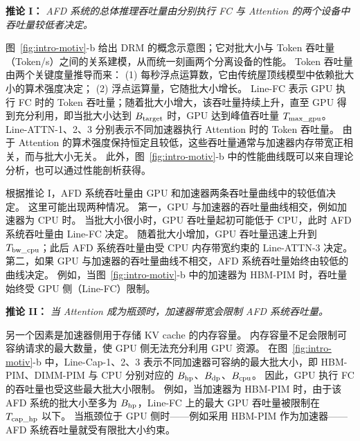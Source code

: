 \begin{mdframed}[backgroundcolor=gray!10,linecolor=black,linewidth=1pt]
\textbf{推论 I：}
\textit{AFD 系统的总体推理吞吐量由分别执行 FC 与 Attention 的两个设备中吞吐量较低者决定。}
\end{mdframed}

图~\ref{fig:intro-motiv}-b 给出 DRM 的概念示意图；它对批大小与 Token 吞吐量（Token/s）之间的关系建模，从而统一刻画两个分离设备的性能。
Token 吞吐量由两个关键度量推导而来：
(1) 每秒浮点运算数，它由传统屋顶线模型中依赖批大小的算术强度决定；
(2) 浮点运算量，它随批大小增长。
Line-FC 表示 GPU 执行 FC 时的 Token 吞吐量；随着批大小增大，该吞吐量持续上升，直至 GPU 得到充分利用，即当批大小达到 $B_{\rm target}$ 时，GPU 达到峰值吞吐量 $T_{\rm max\_gpu}$。
Line-ATTN-1、2、3 分别表示不同加速器执行 Attention 时的 Token 吞吐量。
由于 Attention 的算术强度保持恒定且较低，这些吞吐量通常与加速器内存带宽正相关，而与批大小无关。
此外，图~\ref{fig:intro-motiv}-b 中的性能曲线既可以来自理论分析，也可以通过性能剖析获得。

根据推论 I，AFD 系统吞吐量由 GPU 和加速器两条吞吐量曲线中的较低值决定。
这里可能出现两种情况。
第一，GPU 与加速器的吞吐量曲线相交，例如加速器为 CPU 时。
当批大小很小时，GPU 吞吐量起初可能低于 CPU，此时 AFD 系统吞吐量由 Line-FC 决定。
随着批大小增加，GPU 吞吐量迅速上升到 $T_{\rm bw\_cpu}$；此后 AFD 系统吞吐量由受 CPU 内存带宽约束的 Line-ATTN-3 决定。
第二，如果 GPU 与加速器的吞吐量曲线不相交，AFD 系统吞吐量始终由较低的曲线决定。
例如，当图~\ref{fig:intro-motiv}-b 中的加速器为 HBM-PIM 时，吞吐量始终受 GPU 侧（Line-FC）限制。

\begin{mdframed}[backgroundcolor=gray!10,linecolor=black,linewidth=1pt]
\textbf{推论 II：}
\textit{当 Attention 成为瓶颈时，加速器带宽会限制 AFD 系统吞吐量。}
\end{mdframed}

另一个因素是加速器侧用于存储 KV cache 的内存容量。
内存容量不足会限制可容纳请求的最大数量，使 GPU 侧无法充分利用 GPU 资源。
在图~\ref{fig:intro-motiv}-b 中，Line-Cap-1、2、3 表示不同加速器可容纳的最大批大小，即 HBM-PIM、DIMM-PIM 与 CPU 分别对应的 $B_{\rm hp}$、$B_{\rm dp}$、$B_{\rm cpu}$。
因此，GPU 执行 FC 的吞吐量也受这些最大批大小限制。
例如，当加速器为 HBM-PIM 时，由于该 AFD 系统的批大小至多为 $B_{\rm hp}$，Line-FC 上的最大 GPU 吞吐量被限制在 $T_{\rm cap\_hp}$ 以下。
当瓶颈位于 GPU 侧时——例如采用 HBM-PIM 作为加速器——AFD 系统吞吐量就受有限批大小约束。

